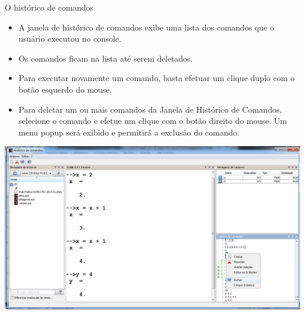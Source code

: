 \begin{frame}{O histórico de comandos}
  \begin{itemize}
    \item A \alert{janela de histórico de comandos} exibe uma lista dos
    comandos que o usuário executou no console.
    \item Os comandos ficam na lista até serem deletados.
    \item Para executar novamente um comando, basta efetuar um clique
    duplo com o botão esquerdo do mouse.
    \item Para deletar um ou mais comandos da Janela de Histórico de
    Comandos, selecione o comando e efetue um clique com o botão direito
    do mouse. Um menu popup será exibido e permitirá a exclusão do
    comando.
  \end{itemize}
  \includegraphics[width=\textwidth]{images/historico.png}
\end{frame}

